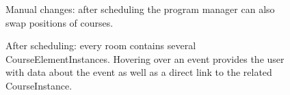 \begin{multicols}{2}

\begin{figure}[H]
%
\caption{Manual changes: after scheduling the program manager can also swap positions of courses.}%
\end{figure}

\begin{figure}[H]
%
\caption{After scheduling: every room contains several CourseElementInstances. Hovering over an event provides the user with data about the event as well as a direct link to the related CourseInstance.}%
\end{figure}

\end{multicols}
\pagebreak
